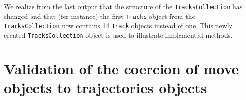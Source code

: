 \documentclass[12pt, oneside, a4paper]{scrbook}
\newcommand{\pkg}[1]{{\normalfont\fontseries{b}\selectfont #1}}
\let\code=\texttt
\begin{document}
We realize from the last output that the structure of the \code{TracksCollection} has changed and that (for instance) the first \code{Tracks} object from the \code{TracksCollection} now contains 14 \code{Track} objects instead of one. This newly created \code{TracksCollection} object is used to illustrate implemented methods.

\clearpage


\section{Validation of the coercion of \pkg{move} objects to \pkg{trajectories} objects}
\label{sec:validmovecoercion}
\end{document}
